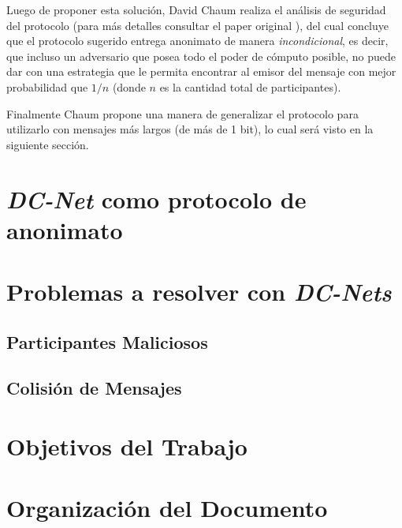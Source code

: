 
Luego de proponer esta solución, David Chaum realiza el análisis de seguridad del protocolo (para más detalles consultar el paper original \cite{chaum1988dining}), del cual concluye que el protocolo sugerido entrega anonimato de manera \emph{incondicional}, es decir, que incluso un adversario que posea todo el poder de cómputo posible, no puede dar con una estrategia que le permita encontrar al emisor del mensaje con mejor probabilidad que $1/n$ (donde $n$ es la cantidad total de participantes).

Finalmente Chaum propone una manera de generalizar el protocolo para utilizarlo con mensajes más largos (de más de 1 bit), lo cual será visto en la siguiente sección.

\section{\emph{DC-Net} como protocolo de anonimato}



\section{Problemas a resolver con \emph{DC-Nets}}

\subsection{Participantes Maliciosos}
\subsection{Colisión de Mensajes}

\section{Objetivos del Trabajo}
\section{Organización del Documento}
